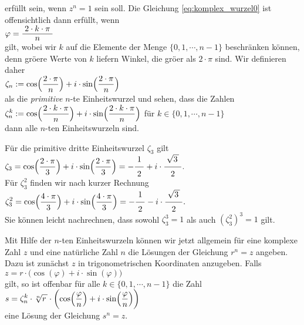 erf\"{u}llt sein, wenn $z^n = 1$ sein soll.  Die Gleichung \ref{eq:komplex_wurzel0} ist offensichtlich dann
erf\"{u}llt, wenn 
\\[0.2cm]
\hspace*{1.3cm}
$\varphi = \bruch{2 \cdot k \cdot \pi}{n}$
\\[0.2cm]
gilt, wobei wir $k$ auf die Elemente der Menge $\{0,1, \cdots, n-1\}$ beschr\"{a}nken k\"{o}nnen, denn gr\"{o}\3ere
Werte von $k$ liefern Winkel, die gr\"{o}\3er als $2 \cdot \pi$ sind.  Wir definieren daher
\\[0.2cm]
\hspace*{1.3cm}
$\displaystyle\zeta_n := \cos\Bigl(\frac{2 \cdot \pi}{n}\Bigr) + i \cdot \sin\Bigl(\frac{2 \cdot \pi}{n}\Bigr)$
\\[0.2cm]
als die \emph{primitive} $n$-te Einheitswurzel und sehen, dass die Zahlen
\\[0.2cm]
\hspace*{1.3cm}
$\displaystyle\zeta_n^k := \cos\Bigl(\frac{2 \cdot k \cdot \pi}{n}\Bigr) + i \cdot \sin\Bigl(\frac{2 \cdot k \cdot \pi}{n}\Bigr)$
\quad f\"{u}r $k \in \{ 0, 1, \cdots, n-1 \}$
\\[0.2cm]
dann alle $n$-ten Einheitswurzeln sind.

\example
F\"{u}r die primitive dritte Einheitswurzel $\zeta_3$ gilt
\\[0.2cm]
\hspace*{1.3cm}
$\ds\zeta_3 = \cos\Bigl(\frac{2 \cdot \pi}{3}\Bigr) + i \cdot \sin\Bigl(\frac{2 \cdot \pi}{3}\Bigr)
 = - \bruch{1}{2} + i \cdot \bruch{\sqrt{3\,}}{2}. 
$
\\[0.2cm] 
F\"{u}r $\zeta_3^2$ finden wir nach kurzer Rechnung
\\[0.2cm]
\hspace*{1.3cm}
$\ds\zeta_3^2 = \cos\Bigl(\frac{4 \cdot \pi}{3}\Bigr) + i \cdot \sin\Bigl(\frac{4 \cdot \pi}{3}\Bigr)
 = - \bruch{1}{2} - i \cdot \bruch{\sqrt{3\,}}{2}. 
$
\\[0.2cm]
Sie k\"{o}nnen leicht nachrechnen, dass sowohl $\zeta_3^3 = 1$ als auch $(\zeta_3^2)^3 = 1$ gilt.
\vspace*{0.2cm}

Mit Hilfe der $n$-ten Einheitswurzeln k\"{o}nnen wir jetzt allgemein f\"{u}r eine komplexe Zahl $z$ und eine
nat\"{u}rliche Zahl $n$ die L\"{o}sungen der Gleichung $r^n = z$ angeben.  Dazu ist zun\"{a}chst $z$ in
trigonometrischen Koordinaten anzugeben.  Falls
\\[0.2cm]
\hspace*{1.3cm}
$z = r \cdot \bigl(\cos(\varphi) + i \cdot \sin(\varphi)\bigr)$
\\[0.2cm]
gilt, so ist offenbar f\"{u}r alle $k \in \{ 0, 1, \cdots, n - 1 \}$ die Zahl
\\[0.2cm]
\hspace*{1.3cm}
$\displaystyle s = \zeta_n^k \cdot \sqrt[n]{r\,} \cdot 
     \biggl(\cos\Bigl(\frac{\varphi}{n}\Bigr) + i \cdot \sin\Bigl(\frac{\varphi}{n}\Bigr) \biggr)
$
\\[0.2cm] 
eine L\"{o}sung der Gleichung $s^n = z$.

